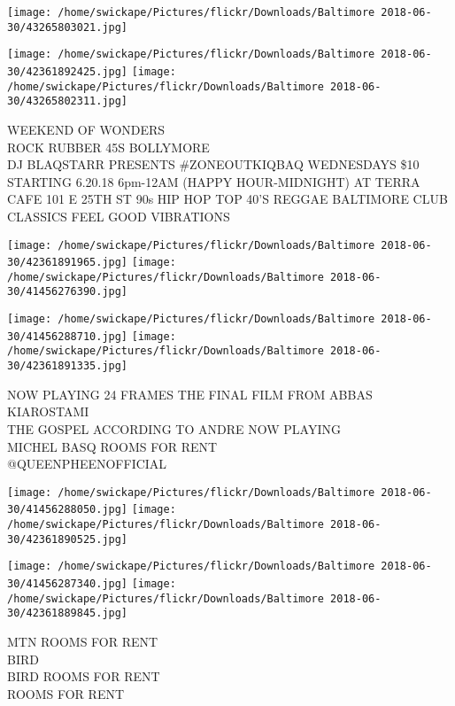 \documentclass[10pt,letterpaper]{article}
\begin{document}
\texttt{[image: /home/swickape/Pictures/flickr/Downloads/Baltimore 2018-06-30/43265803021.jpg]}

\vspace{0.25in}
\texttt{[image: /home/swickape/Pictures/flickr/Downloads/Baltimore 2018-06-30/42361892425.jpg]}
\texttt{[image: /home/swickape/Pictures/flickr/Downloads/Baltimore 2018-06-30/43265802311.jpg]}

WEEKEND OF WONDERS\\
ROCK RUBBER 45S BOLLYMORE\\
DJ BLAQSTARR PRESENTS \#ZONEOUTKIQBAQ WEDNESDAYS \$10 STARTING 6.20.18 6pm{-}12AM (HAPPY HOUR{-}MIDNIGHT) AT TERRA CAFE 101 E 25TH ST 90s HIP HOP TOP 40'S REGGAE BALTIMORE CLUB CLASSICS FEEL GOOD VIBRATIONS\\
\pagebreak

\texttt{[image: /home/swickape/Pictures/flickr/Downloads/Baltimore 2018-06-30/42361891965.jpg]}
\texttt{[image: /home/swickape/Pictures/flickr/Downloads/Baltimore 2018-06-30/41456276390.jpg]}

\texttt{[image: /home/swickape/Pictures/flickr/Downloads/Baltimore 2018-06-30/41456288710.jpg]}
\texttt{[image: /home/swickape/Pictures/flickr/Downloads/Baltimore 2018-06-30/42361891335.jpg]}

NOW PLAYING 24 FRAMES THE FINAL FILM FROM ABBAS KIAROSTAMI\\
THE GOSPEL ACCORDING TO ANDRE NOW PLAYING\\
MICHEL BASQ ROOMS FOR RENT\\
@QUEENPHEENOFFICIAL\\
\pagebreak

\texttt{[image: /home/swickape/Pictures/flickr/Downloads/Baltimore 2018-06-30/41456288050.jpg]}
\texttt{[image: /home/swickape/Pictures/flickr/Downloads/Baltimore 2018-06-30/42361890525.jpg]}

\texttt{[image: /home/swickape/Pictures/flickr/Downloads/Baltimore 2018-06-30/41456287340.jpg]}
\texttt{[image: /home/swickape/Pictures/flickr/Downloads/Baltimore 2018-06-30/42361889845.jpg]}

MTN ROOMS FOR RENT\\
BIRD\\
BIRD ROOMS FOR RENT\\
ROOMS FOR RENT\\
\pagebreak
\end{document}
